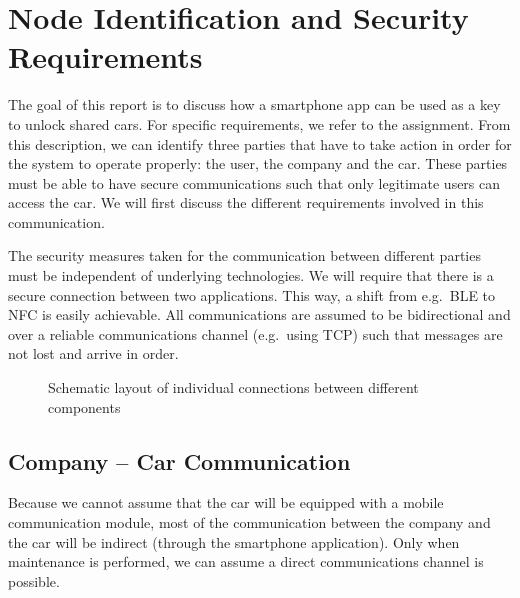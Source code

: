 \section{Node Identification and Security Requirements}

The goal of this report is to discuss how a smartphone app can be used as a key to unlock shared cars. For specific requirements, we refer to the assignment. From this description, we can identify three parties that have to take action in order for the system to operate properly: the user, the company and the car. These parties must be able to have secure communications such that only legitimate users can access the car. We will first discuss the different requirements involved in this communication.

The security measures taken for the communication between different parties must be independent of underlying technologies. We will require that there is a secure connection between two applications. This way, a shift from e.g.\ BLE to NFC is easily achievable. All communications are assumed to be bidirectional and over a reliable communications channel (e.g.\ using TCP) such that messages are not lost and arrive in order.

\begin{figure}[!ht]
  \centering
  \caption{Schematic layout of individual connections between different components}
  \label{Communication}
\end{figure}

\subsection{Company -- Car Communication}

Because we cannot assume that the car will be equipped with a mobile communication module, most of the communication between the company and the car will be indirect (through the smartphone application). Only when maintenance is performed, we can assume a direct communications channel is possible.


